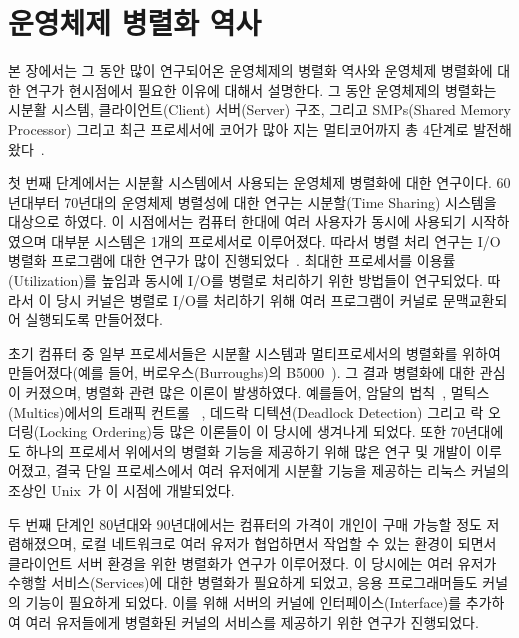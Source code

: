 \section{운영체제 병렬화 역사}
본 장에서는 그 동안 많이 연구되어온 운영체제의 병렬화 역사와 운영체제 병렬화에 대한 연구가 
현시점에서 필요한 이유에 대해서 설명한다.
그 동안 운영체제의 병렬화는 시분활 시스템, 클라이언트(Client) 서버(Server) 구조, 그리고 SMPs(Shared Memory
Processor) 그리고 최근 프로세서에 코어가 많아 지는 멀티코어까지 총 4단계로 발전해 왔다~\cite{Kaashoek2015PCO}.

첫 번째 단계에서는 시분활 시스템에서 사용되는 운영체제 병렬화에 대한 연구이다. 
60년대부터 70년대의 운영체제 병렬성에 대한 연구는 시분할(Time Sharing) 시스템을 대상으로 하였다.
이 시점에서는 컴퓨터 한대에 여러 사용자가 동시에 사용되기 시작하였으며 대부분 시스템은 1개의 프로세서로 이루어졌다.
따라서 병렬 처리 연구는 I/O 병렬화 프로그램에 대한 연구가 많이 진행되었다~\cite{Bloch1959EDS}.
최대한 프로세서를 이용률(Utilization)를 높임과 동시에 I/O를 병렬로 처리하기 위한 방법들이 연구되었다.
따라서 이 당시 커널은 병렬로 I/O를 처리하기 위해 여러 프로그램이 커널로 문맥교환되어 실행되도록 만들어졌다.
 
초기 컴퓨터 중 일부 프로세서들은 시분활 시스템과 멀티프로세서의 병렬화를 위하여 만들어졌다(예를 들어, 버로우스(Burroughs)의 B5000~\cite{Mayer1982ABB}).
그 결과 병렬화에 대한 관심이 커졌으며, 
병렬화 관련 많은 이론이 발생하였다. 
예를들어, 암달의 법칙~\cite{Amdahl1967VSP}, 멀틱스(Multics)에서의 트래픽 컨트롤
~\cite{Saltzer1966TCM}, 데드락 디텍션(Deadlock Detection) 그리고 락 오더링(Locking
Ordering)등 많은 이론들이 이 당시에 생겨나게 되었다. 
또한 70년대에도 하나의 프로세서 위에서의 병렬화 기능을 제공하기 위해 많은 연구 및 개발이 이루어졌고, 
결국 단일 프로세스에서 여러 유저에게 시분활 기능을 제공하는 리눅스 커널의 
조상인 Unix~\cite{Ritchie1973UTS}가 이 시점에 개발되었다.

두 번째 단계인 80년대와 90년대에서는 컴퓨터의 가격이 개인이 구매 가능할 정도 저렴해졌으며,
로컬 네트워크로 여러 유저가 협업하면서 작업할 수 있는 환경이 되면서 클라이언트 서버 환경을 위한 
병렬화가 연구가 이루어졌다.
이 당시에는 여러 유저가 수행할 서비스(Services)에 대한 병렬화가 필요하게 되었고, 
응용 프로그래머들도 커널의 기능이 필요하게 되었다.
이를 위해 서버의 커널에 인터페이스(Interface)를 추가하여 여러 유저들에게 병렬화된 
커널의 서비스를 제공하기 위한 연구가 진행되었다.
 
